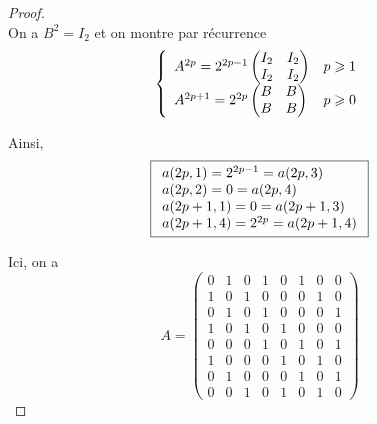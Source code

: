 \begin{proof}
\begin{equation}
    \end{equation}
    On a $B^{2}=I_{2}$ et on montre par récurrence
    \begin{equation}
        \left\lbrace
            \begin{array}[]{ll}
                A^{2p}=2^{2p-1}
                \begin{pmatrix}
                    I_{2} &I_{2}\\ I_{2}&I_{2}
                \end{pmatrix} &p\geqslant1\\
                A^{2p+1}=2^{2p}
                \begin{pmatrix}
                    B & B\\B &B
                \end{pmatrix}&p\geqslant0
            \end{array}
        \right.
    \end{equation}

    Ainsi,
    \begin{equation}
        \boxed{
            \begin{array}[]{l}
                a(2p,1)=2^{2p-1}=a(2p,3)\\
                a(2p,2)=0=a(2p,4)\\
                a(2p+1,1)=0=a(2p+1,3)\\
                a(2p+1,4)=2^{2p}=a(2p+1,4)\\
            \end{array}
        }
    \end{equation}

    \item Ici, on a 
    \begin{equation}
        A=
        \begin{pmatrix}
            0 &1 &0 &1 &0 &1 &0 &0\\
            1 &0 &1 &0 &0 &0 &1 &0\\
            0 &1 &0 &1 &0 &0 &0 &1\\
            1 &0 &1 &0 &1 &0 &0 &0\\
            0 &0 &0 &1 &0 &1 &0 &1\\
            1 &0 &0 &0 &1 &0 &1 &0\\
            0 &1 &0 &0 &0 &1 &0 &1\\
            0 &0 &1 &0 &1 &0 &1 &0
        \end{pmatrix}
    \end{equation}


\end{proof}
